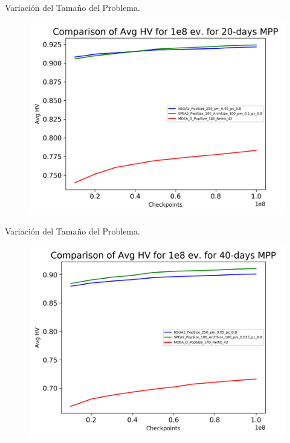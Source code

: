 \documentclass[12pt]{beamer}
\begin{document}
\begin{frame}[fragile]{Variación del Tamaño del Problema.}
\begin{figure}
    \centering
    \includegraphics[width=1.0\linewidth]{images/avg_evolution_20_days.png}
\end{figure}
\end{frame}

\begin{frame}[fragile]{Variación del Tamaño del Problema.}
\begin{figure}
    \centering
    \includegraphics[width=1.0\linewidth]{images/avg_evolution_40_days.png}
\end{figure}
\end{frame}
\end{document}
